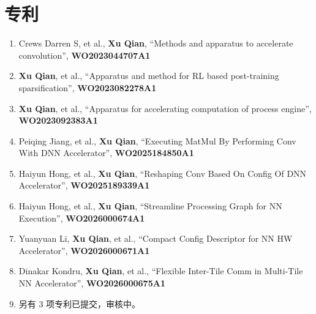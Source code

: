 \documentclass{resume_zh}
\begin{document}
\section{专利}
\begin{enumerate}
  \item Crews Darren S, et al., \textbf{Xu Qian}, ``Methods and apparatus to accelerate convolution'', \textbf{WO2023044707A1}
  \item \textbf{Xu Qian}, et al., ``Apparatus and method for RL based post-training sparsification'', \textbf{WO2023082278A1}
  \item \textbf{Xu Qian}, et al., ``Apparatus for accelerating computation of process engine'', \textbf{WO2023092383A1}
  \item Peiqing Jiang, et al., \textbf{Xu Qian}, ``Executing MatMul By Performing Conv With DNN Accelerator'', \textbf{WO2025184850A1}
  \item Haiyun Hong, et al., \textbf{Xu Qian}, ``Reshaping Conv Based On Config Of DNN Accelerator'', \textbf{WO2025189339A1}
  \item Haiyun Hong, et al., \textbf{Xu Qian}, ``Streamline Processing Graph for NN Execution'', \textbf{WO2026000674A1}
  \item Yuanyuan Li, \textbf{Xu Qian}, et al., ``Compact Config Descriptor for NN HW Accelerator'', \textbf{WO2026000671A1}
  \item Dinakar Kondru, \textbf{Xu Qian}, et al., ``Flexible Inter-Tile Comm in Multi-Tile NN Accelerator'', \textbf{WO2026000675A1}
  \item[+] 另有 3 项专利已提交，审核中。
\end{enumerate}
\end{document}
